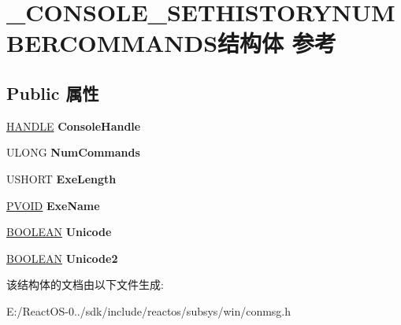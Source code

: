 \hypertarget{struct___c_o_n_s_o_l_e___s_e_t_h_i_s_t_o_r_y_n_u_m_b_e_r_c_o_m_m_a_n_d_s}{}\section{\+\_\+\+C\+O\+N\+S\+O\+L\+E\+\_\+\+S\+E\+T\+H\+I\+S\+T\+O\+R\+Y\+N\+U\+M\+B\+E\+R\+C\+O\+M\+M\+A\+N\+D\+S结构体 参考}
\label{struct___c_o_n_s_o_l_e___s_e_t_h_i_s_t_o_r_y_n_u_m_b_e_r_c_o_m_m_a_n_d_s}
\subsection*{Public 属性}
\begin{DoxyCompactItemize}
\item 
\mbox{\label{struct___c_o_n_s_o_l_e___s_e_t_h_i_s_t_o_r_y_n_u_m_b_e_r_c_o_m_m_a_n_d_s_a1ff7150e877893a2b85cac87da763468}} 
\hyperlink{interfacevoid}{H\+A\+N\+D\+LE} {\bfseries Console\+Handle}
\item 
\mbox{\label{struct___c_o_n_s_o_l_e___s_e_t_h_i_s_t_o_r_y_n_u_m_b_e_r_c_o_m_m_a_n_d_s_a4d79978597a52f39597817b1eac68c8c}} 
U\+L\+O\+NG {\bfseries Num\+Commands}
\item 
\mbox{\label{struct___c_o_n_s_o_l_e___s_e_t_h_i_s_t_o_r_y_n_u_m_b_e_r_c_o_m_m_a_n_d_s_a6b39e6b27bf939d626db19c12efaae30}} 
U\+S\+H\+O\+RT {\bfseries Exe\+Length}
\item 
\mbox{\label{struct___c_o_n_s_o_l_e___s_e_t_h_i_s_t_o_r_y_n_u_m_b_e_r_c_o_m_m_a_n_d_s_aeb0a29fe612ecddc552e22304abaea02}} 
\hyperlink{interfacevoid}{P\+V\+O\+ID} {\bfseries Exe\+Name}
\item 
\mbox{\label{struct___c_o_n_s_o_l_e___s_e_t_h_i_s_t_o_r_y_n_u_m_b_e_r_c_o_m_m_a_n_d_s_ac86e319ea466eae8fb0394855a9e42ff}} 
\hyperlink{_processor_bind_8h_a112e3146cb38b6ee95e64d85842e380a}{B\+O\+O\+L\+E\+AN} {\bfseries Unicode}
\item 
\mbox{\label{struct___c_o_n_s_o_l_e___s_e_t_h_i_s_t_o_r_y_n_u_m_b_e_r_c_o_m_m_a_n_d_s_ad6c94a5be411ba62c443d6edf8e4d598}} 
\hyperlink{_processor_bind_8h_a112e3146cb38b6ee95e64d85842e380a}{B\+O\+O\+L\+E\+AN} {\bfseries Unicode2}
\end{DoxyCompactItemize}


该结构体的文档由以下文件生成\+:\begin{DoxyCompactItemize}
\item 
E\+:/\+React\+O\+S-\/0../sdk/include/reactos/subsys/win/conmsg.\+h\end{DoxyCompactItemize}
